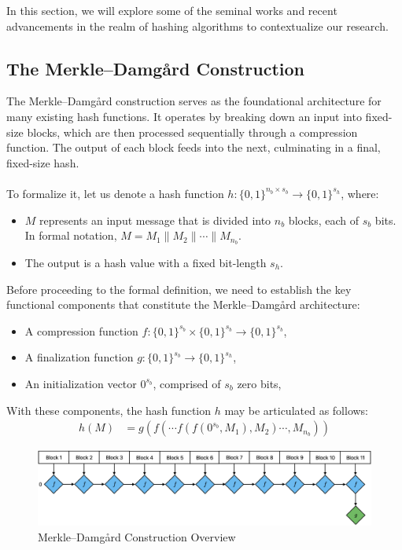 \documentclass[10pt]{article}
\begin{document}
In this section, we will explore some of the seminal works and recent advancements in the realm of hashing algorithms to contextualize our research.

\subsection{The Merkle--Damgård Construction}

The Merkle–Damgård construction serves as the foundational architecture for many existing hash functions.
It operates by breaking down an input into fixed-size blocks, which are then processed sequentially through a compression
function. The output of each block feeds into the next, culminating in a final, fixed-size hash.\\\\
To formalize it, let us denote a hash function \( h: \{0,1\}^{n_b \times s_b} \to \{0,1\}^{s_h} \), where:
\begin{itemize}
    \item \( M \) represents an input message that is divided into \( n_b \) blocks, each of \( s_b \) bits. In formal notation, \( M = M_1 \parallel M_2 \parallel \cdots \parallel M_{n_b} \).
    \item The output is a hash value with a fixed bit-length \( s_h \).
\end{itemize}
Before proceeding to the formal definition, we need to establish the key functional components that constitute the Merkle--Damgård architecture:
\begin{itemize}
    \item A compression function \( f: \{0,1\}^{s_b} \times \{0,1\}^{s_b} \to \{0,1\}^{s_b} \),
    \item A finalization function \( g: \{0,1\}^{s_b} \to \{0,1\}^{s_h} \),
    \item An initialization vector \( 0^{s_b} \), comprised of \( s_b \) zero bits,
\end{itemize}

With these components, the hash function \( h \) may be articulated as follows:
\begin{align*}
    h(M) &= g\left( f(\cdots f(f(0^{s_b}, M_1), M_2) \cdots, M_{n_b}) \right)
\end{align*}

\begin{figure}[H]
\centering
\includegraphics[width=1\textwidth]{linear-construction.png}
\caption{Merkle–Damgård Construction Overview}
\label{fig:linear-construction}
\end{figure}
\end{document}
